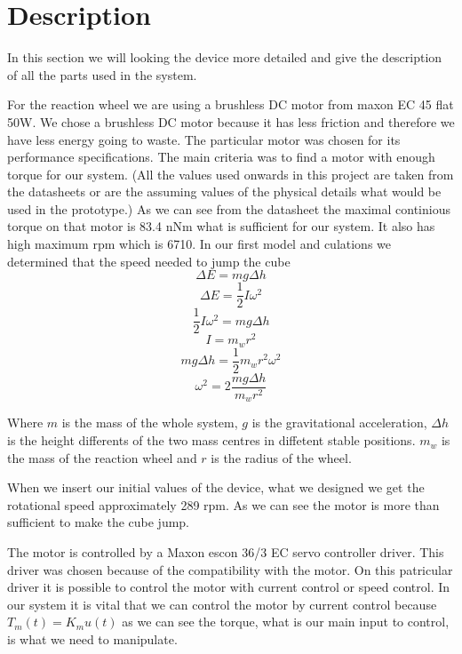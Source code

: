 \section{Description}

In this section we will looking the device more detailed and give the description of all the parts used in the system.

For the reaction wheel we are using a brushless DC motor from maxon EC 45 flat 50W.
We chose a brushless DC motor because it has less friction and therefore we have less energy going to waste.
The particular motor was chosen for its performance specifications.
The main criteria was to find a motor with enough torque for our system.
(All the values used onwards in this project are taken from the datasheets or are the assuming values of the physical details what would be used in the prototype.)
As we can see from the datasheet the maximal continious torque on that motor is 83.4 nNm what is sufficient for our system.
It also has high maximum rpm which is 6710.
In our first model and culations we determined that the speed needed to jump the cube 
\begin{equation}
 \Delta E=mg\Delta h
\end{equation}
\begin{equation}
 \Delta E=\frac{1}{2}I\omega ^{2}
\end{equation}
\begin{equation}
 \frac{1}{2}I\omega ^{2}=mg\Delta h
\end{equation}
\begin{equation}
 I=m_{w}r^{2}
\end{equation}
\begin{equation}
 mg\Delta h=\frac{1}{2}m_{w}r^{2}\omega ^{2}
\end{equation}
\begin{equation}
 \omega ^{2}=2\frac{mg\Delta h}{m_{w}r^{2}}
\end{equation}

Where $m$ is the mass of the whole system, $g$ is the gravitational acceleration, $\Delta h$ is the height differents of the two mass centres in diffetent stable positions.
$m_{w}$ is the mass of the reaction wheel and $r$ is the radius of the wheel.

When we insert our initial values of the device, what we designed we get the rotational speed approximately 289 rpm.
As we can see the motor is more than sufficient to make the cube jump.

The motor is controlled by a Maxon escon 36/3 EC servo controller driver.
This driver was chosen because of the compatibility with the motor.
On this patricular driver it is possible to control the motor with current control or speed control.
In our system it is vital that we can control the motor by current control because $ T_{m}(t)=K_{m}u(t)$ as we can see the torque, what is our main input to control, is what we need to manipulate.

